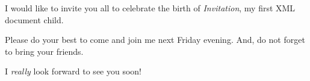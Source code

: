 \documentclass[]{article}
\begin{document}
\begin{Front}
\end{Front}
\begin{Body}
\par 
I would like to invite you all to celebrate
the birth of \emph{Invitation}, my
first XML document child.
\par 
Please do your best to come and join me next Friday
evening. And, do not forget to bring your friends.
\par 
I \emph{really} look forward to see you soon!
\end{Body}
\begin{Back}
\end{Back}
\end{document}
